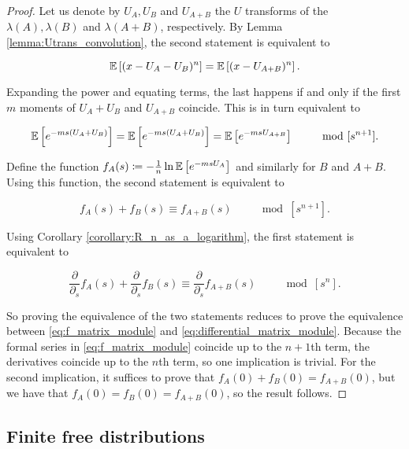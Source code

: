\begin{proof}
    Let us denote by $U_A, U_B$ and $U_{A+B}$ the $U$ transforms of the $\lambda(A), \lambda(B)$ and $\lambda(A+B)$, respectively. By Lemma \ref{lemma:Utrans_convolution}, the second statement is equivalent to 

    \begin{equation*}
        \mathbb E \left[  (x - U_A - U_B)^n  \right] = \mathbb E \left[  (x - U_{A+B})^n  \right].
    \end{equation*}

    Expanding the power and equating terms, the last happens if and only if the first $m$ moments of $U_A + U_B$ and $U_{A+B}$ coincide. This is in turn equivalent to 

    \begin{equation*}
        \mathbb E \left[ e^{-ms(U_A + U_B)} \right] = \mathbb E \left[ e^{-ms(U_A + U_B)} \right] = \mathbb E \left[  e^{-msU_{A+B}}  \right] \qquad \mod [s^{n+1}].
    \end{equation*}

    Define the function $f_A(s) \coloneqq - \frac1n \ln \mathbb E \left[  e^{-msU_A}  \right]$ and similarly for $B$ and $A+B$. Using this function, the second statement is equivalent to 

    \begin{equation} \label{eq:f_matrix_module}
        f_A(s) + f_B(s) \equiv f_{A+B}(s) \qquad \mod [s^{n+1}].
    \end{equation}

    Using Corollary \ref{corollary:R_n_as_a_logarithm}, the first statement is equivalent to 

    \begin{equation} \label{eq:differential_matrix_module}
        \frac{\partial}{\partial_s} f_A(s) + \frac{\partial}{\partial_s} f_B(s) \equiv \frac{\partial}{\partial_s} f_{A+B}(s) \qquad \mod[s^n].
    \end{equation}

    So proving the equivalence of the two statements reduces to prove the equivalence between \eqref{eq:f_matrix_module} and \eqref{eq:differential_matrix_module}. Because the formal series in \eqref{eq:f_matrix_module} coincide up to the $n+1$th term, the derivatives coincide up to the $n$th term, so one implication is trivial. For the second implication, it suffices to prove that $f_A(0) + f_B(0) = f_{A+B}(0)$, but we have that $f_A(0)=f_B(0)=f_{A+B}(0)$, so the result follows.
\end{proof} 

\subsection{Finite free distributions}

